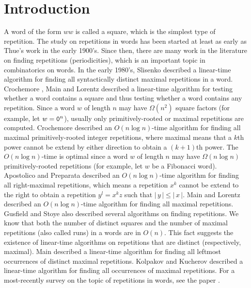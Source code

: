 \documentclass{article}
\def\abs#1{{|\,#1\,|}}
\begin{document}
\section{Introduction}
A word of the form $ww$ is called a square, which is the simplest
type of repetition. The study on repetitions in words has been
started at least as early as Thue's work \cite{Thue1906} in the
early 1900's. Since then, there are many work in the literature on
finding repetitions (periodicities), which is an important topic in
combinatorics on words. In the early 1980's, Slisenko
\cite{Slisenko1983} described a linear-time algorithm for finding
all syntactically distinct maximal repetitions in a word. Crochemore
\cite{Crochemore1983}, Main and Lorentz \cite{Main&Lorentz1985}
described a linear-time algorithm for testing whether a word
contains a square and thus testing whether a word contains any
repetition. Since a word $w$ of length $n$ may have $\Omega(n^2)$
square factors (for example, let $w={\tt0}^n$), usually only
primitively-rooted or maximal repetitions are computed. Crochemore
\cite{Crochemore1981} described an $O(n\log n)$-time algorithm for
finding all maximal primitively-rooted integer repetitions, where
maximal means that a $k$th power cannot be extend by either
direction to obtain a $(k+1)$th power. The $O(n\log n)$-time is
optimal since a word $w$ of length $n$ may have $\Omega(n\log n)$
primitively-rooted repetitions (for example, let $w$ be a Fibonacci
word). Apostolico and Preparata \cite{Apostolico&Preparata1983}
described an $O(n\log n)$-time algorithm for finding all
right-maximal repetitions, which means a repetition $x^k$ cannot be
extend to the right to obtain a repetition $y^l=x^kz$ such that
$\abs{y}\leq\abs{x}$. Main and Lorentz \cite{Main&Lorentz1984}
described an $O(n\log n)$-time algorithm for finding all maximal
repetitions. Gusfield and Stoye
\cite{Stoye&Gusfield1998,Gusfield&Stoye2004} also described several algorithms on finding repetitions. We know
that both the number of distinct squares \cite{Fraenkel&Simpson1998}
and the number of maximal repetitions (also called runs)
\cite{Kolpakov&Kucherov1999} in a words are in $O(n)$. This fact
suggests the existence of linear-time algorithms on repetitions that
are distinct (respectively, maximal). Main \cite{Main1989} described
a linear-time algorithm for finding all leftmost occurrences of
distinct maximal repetitions. Kolpakov and Kucherov
\cite{Kolpakov&Kucherov1999} described a linear-time algorithm for
finding all occurrences of maximal repetitions. For a most-recently
survey on the topic of repetitions in words, see the paper
\cite{Crochemore&Ilie&Rytter2009}.
\end{document}
